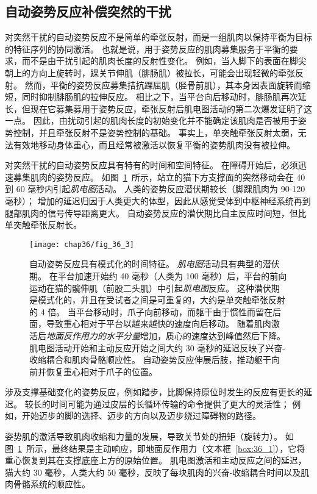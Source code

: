 \subsection{自动姿势反应补偿突然的干扰}

对突然干扰的自动姿势反应不是简单的牵张反射，而是一组肌肉以保持平衡为目标的特征序列的协同激活。
也就是说，用于姿势反应的肌肉募集服务于平衡的要求，而不是由干扰引起的肌肉长度的反射性变化。
例如，当人脚下的表面在脚尖朝上的方向上旋转时，踝关节伸肌（腓肠肌）被拉长，可能会出现轻微的牵张反射。
然而，平衡的姿势反应募集拮抗踝屈肌（胫骨前肌），其本身因表面旋转而缩短，同时抑制腓肠肌的拉伸反应。
相比之下，当平台向后移动时，腓肠肌再次延长，但现在它募集募用于姿势反应，牵张反射后肌电图活动的第二次爆发证明了这一点。
因此，由扰动引起的肌肉长度的初始变化并不能确定该肌肉是否被用于姿势控制，并且牵张反射不是姿势控制的基础。
事实上，单突触牵张反射太弱，无法有效地移动身体重心，而且经常被激活以恢复平衡的姿势肌肉没有被拉伸。


对突然干扰的自动姿势反应具有特有的时间和空间特征。 在障碍开始后，必须迅速募集肌肉的姿势反应。
如图~\ref{fig:36_3}~所示，站立的猫下方支撑面的突然移动会在 40 到 60 毫秒内引起\textit{肌电图}活动。
人类的姿势反应潜伏期较长（脚踝肌肉为 90-120 毫秒）；
增加的延迟归因于人类更大的体型，因此从感觉受体到中枢神经系统再到腿部肌肉的信号传导距离更大。
自动姿势反应的潜伏期比自主反应时间短，但比单突触牵张反射长。


\begin{figure}[htbp]
	\centering
	\texttt{[image: chap36/fig\_36\_3]}
	\caption{自动姿势反应具有模式化的时间特征。
		\textit{肌电图}活动具有典型的潜伏期。
		在平台加速开始约 40 毫秒（人类为 100 毫秒）后，平台的前向运动在猫的髋伸肌（前股二头肌）中引起\textit{肌电图}反应。
		这种潜伏期是模式化的，并且在受试者之间是可重复的，大约是单突触牵张反射的 4 倍。
		当平台移动时，爪子向前移动，而躯干由于惯性而留在后面，导致重心相对于平台以越来越快的速度向后移动。
		随着肌肉激活后\textit{地面反作用力的水平分量}增加，质心的速度达到峰值然后下降。
		肌电图活动开始和主动反应开始之间大约 30 毫秒的延迟反映了兴奋-收缩耦合和肌肉骨骼顺应性。
		自动姿势反应伸展后肢，推动躯干向前并恢复重心相对于爪子的位置。}
	\label{fig:36_3}
\end{figure}


涉及支撑基础变化的姿势反应，例如踏步，比脚保持原位时发生的反应有更长的延迟。
较长的时间可能为通过皮层的长循环传输的命令提供了更大的灵活性；
例如，开始迈步的脚的选择、迈步的方向以及迈步绕过障碍物的路径。


姿势肌的激活导致肌肉收缩和力量的发展，导致关节处的扭矩（旋转力）。
如图~\ref{fig:36_3}~所示，最终结果是主动响应，即地面反作用力（文本框~\ref{box:36_1}），它将重心恢复到其在支撑底座上方的原始位置。
肌电图激活和主动反应之间的延迟，猫大约 30 毫秒，人类大约 50 毫秒，反映了每块肌肉的兴奋-收缩耦合时间以及肌肉骨骼系统的顺应性。


